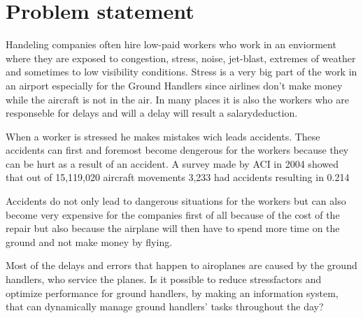 \section{Problem statement}

Handeling companies often hire low-paid workers who work in an enviorment where they are exposed to congestion, stress, noise, jet-blast, extremes of weather and sometimes to low visibility conditions. Stress is a very big part of the work in an airport especially for the Ground Handlers since airlines don't make money while the aircraft is not in the air.  In many places it is also the workers who are responseble for delays and will a delay will result a salarydeduction.

When a worker is stressed he makes mistakes wich leads accidents. These accidents can first and foremost become dengerous for the workers because they can be hurt as a result of an accident. A survey made by ACI in 2004 showed that out of 15,119,020 aircraft movements 3,233 had accidents resulting in 0.214%

Accidents do not only lead to dangerous situations for the workers but can also become very expensive for the companies first of all because of the cost of the repair but also because the airplane will then have to spend more time on the ground and not make money by flying.


Most of the delays and errors that happen to airoplanes are caused by the ground handlers, who service the planes. Is it possible to reduce stressfactors and optimize performance for ground handlers, by making an information system, that can dynamically manage ground handlers' tasks throughout the day?